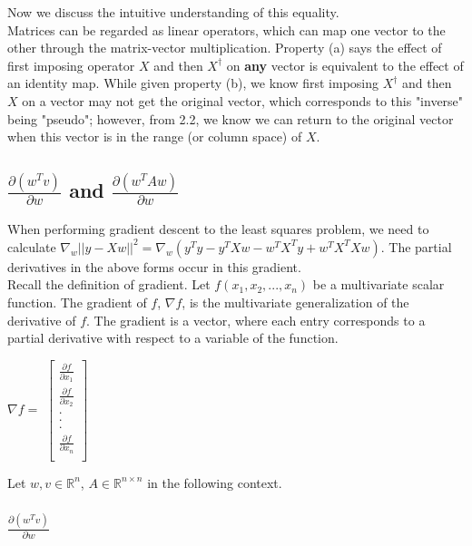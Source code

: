 \documentclass[11pt]{article}
\begin{document}
Now we discuss the intuitive understanding of this equality. \\

Matrices can be regarded as linear operators, which can map one vector to the other through the matrix-vector multiplication. Property (a) says the effect of first imposing operator $X$ and then $X^{\dagger}$ on \textbf{any} vector is equivalent to the effect of an identity map. While given property (b), we know first imposing $X^{\dagger}$ and then $X$ on a vector may not get the original vector, which corresponds to this "inverse" being "pseudo"; however, from 2.2, we know we can return to the original vector when this vector is in the range (or column space) of $X$. 

\subsection{$\frac{\partial (w^{T}v)}{\partial w}$ and $\frac{\partial (w^{T}Aw)}{\partial w}$}
When performing gradient descent to the least squares problem, we need to calculate $\nabla_w ||y-Xw||^2 = \nabla_w (y^{T}y-y^{T}Xw-w^{T}X^{T}y+w^{T}X^{T}Xw)$. The partial derivatives in the above forms occur in this gradient.\\

Recall the definition of gradient. Let $f(x_1, x_2, ...,x_n)$ be a multivariate scalar function. The gradient of $f$, $\nabla f$, is the multivariate generalization of the derivative of $f$. The gradient is a vector, where each entry corresponds to a partial derivative with respect to a variable of the function.
    \begin{center}
    $\nabla f =$
    $\begin{bmatrix}
    \frac{\partial f}{\partial x_1} \\ 
    \frac{\partial f}{\partial x_2} \\ . \\.\\.\\
    \frac{\partial f}{\partial x_n}\\
    \end{bmatrix}$
    \end{center}
  
Let $w,v \in \mathbb{R}^n$, $A \in \mathbb{R}^{n \times n}$ in the following context. 
 
\subsubsection{$\frac{\partial (w^{T}v)}{\partial w}$}
\end{document}

